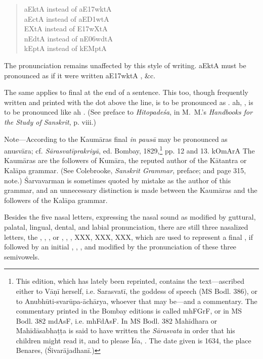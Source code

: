 \begin{quote}
  {\dn a\2EktA} instead of {\dn aE\317wktA} \\
  {\dn a\2EctA} instead of {\dn aE\3D1wtA} \\
  {\dn {}\2EXtA} instead of {\dn {}E\317wXtA} \\
  {\dn n\2EdtA} instead of {\dn nE\306wdtA} \\
  {\dn k\2EptA} instead of {\dn kEMptA} \\
\end{quote}

The pronunciation remains unaffected by this style of writing.
{\dn a\2EktA} must be pronounced as if it were written {\dn aE\317wktA}
, \&c.

The same applies to final {\dn {}}  at the end of a sentence. This
too, though frequently written and printed with the dot above the line,
is to be pronounced as . {\dn ah\2}, , is to be pronounced
like {\dn ah} . (See preface to \emph{Hitopadeśa}, in M.\ M.'s
\emph{Handbooks for the Study of Sanskrit}, p. viii.)

\begin{note}
  Note—According to the Kaumāras final {\dn {}}  \emph{in pausā} may
  be pronounced as anusvāra; cf. \emph{Sārasvatīprakriyā}, ed. Bombay,
  1829,\footnote{This edition, which has lately been reprinted, contains
    the text—ascribed either to Vāṇī herself, i.e. Sarasvatī, the
    goddess of speech (MS Bodl. 386), or to Anubhūti-svarūpa-āchārya,
    whoever that may be—and a commentary. The commentary printed in the
    Bombay editions is called {\dn mhFGrF}, or in MS Bodl. 382
    {\dn m\4dAsF}, i.e. {\dn mhFdAsF}. In MS Bodl. 382 Mahīdhara or
    Mahīdāsabhaṭṭa is said to have written the \emph{Sārasvata} in order
    that his children might read it, and to please Īśa, .
    The date given is 1634, the place Benares, (Śivarājadhanī.)} pp. 12
  and 13. {\dn kOmArA} The Kaumāras are the followers of Kumāra, the reputed
  author of the Kātantra or Kalāpa grammar. (See Colebrooke,
  \emph{Sanskrit Grammar}, preface; and page 315, note.) Śarvavarman is
  sometimes quoted by mistake as the author of this grammar, and an
  unnecessary distinction is made between the Kaumāras and the followers
  of the Kalāpa grammar.
\end{note}

\s Besides the five nasal letters, expressing the nasal sound as
modified by guttural, palatal, lingual, dental, and labial
pronunciation, there are still three nasalized letters, the {\dn {}\1},
{\dn {}\1}, {\dn {}\1}, or {\dn {}\2}, {\dn {}\2}, {\dn {}\2}, XXX, XXX, XXX, which are used to
represent a final {\dn {}} , if followed by an initial {\dn {}} ,
{\dn {}} , {\dn {}} , and modified by the pronunciation of these
three semivowels.

